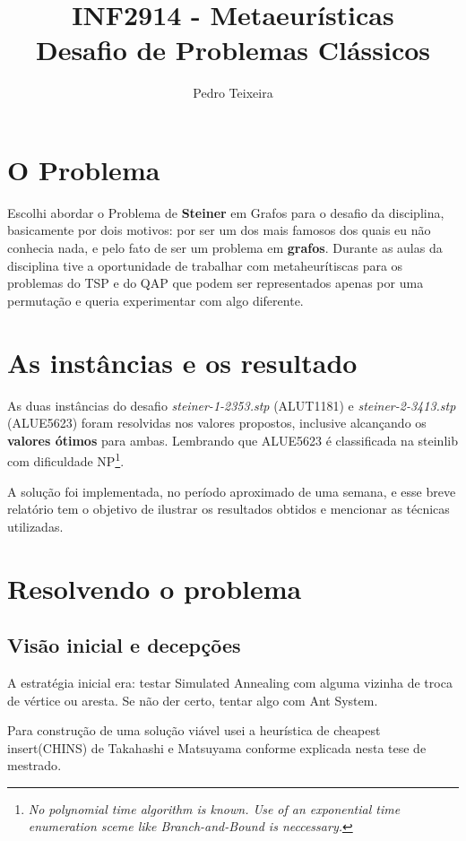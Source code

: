 \documentclass[a4paper,10pt,brazilian]{article}
\title{INF2914 - Metaeurísticas \\ Desafio de Problemas Clássicos}
\author{Pedro Teixeira}
\begin{document}
\maketitle

\section{O Problema}

Escolhi abordar o Problema de \textbf{Steiner} em Grafos para o desafio da disciplina, basicamente por dois motivos: por ser um dos mais famosos dos quais eu não conhecia nada, e pelo fato de ser um problema em \textbf{grafos}. Durante as aulas da disciplina tive a oportunidade de trabalhar com metaheurítiscas para os problemas do TSP e do QAP que podem ser representados apenas por uma permutação e queria experimentar com algo diferente.

\section{As instâncias e os resultado}

As duas instâncias do desafio \textit{steiner-1-2353.stp} (ALUT1181) e \textit{steiner-2-3413.stp} (ALUE5623) foram resolvidas nos valores propostos, inclusive alcançando os \textbf{valores ótimos} para ambas. Lembrando que ALUE5623 é classificada na steinlib com dificuldade NP\footnote{\textit{No polynomial time algorithm is known. Use of an exponential time enumeration sceme like Branch-and-Bound is neccessary.}}.

A solução foi implementada, no período aproximado de uma semana, e esse breve relatório tem o objetivo de ilustrar os resultados obtidos e mencionar as técnicas utilizadas.

\section{Resolvendo o problema}

\subsection{Visão inicial e decepções}
A estratégia inicial era: testar Simulated Annealing com alguma vizinha de troca de vértice ou aresta. Se não der certo, tentar algo com Ant System.

Para construção de uma solução viável usei a heurística de cheapest insert(CHINS) de Takahashi e Matsuyama conforme explicada nesta tese de mestrado\cite{tabu}.
\end{document}
